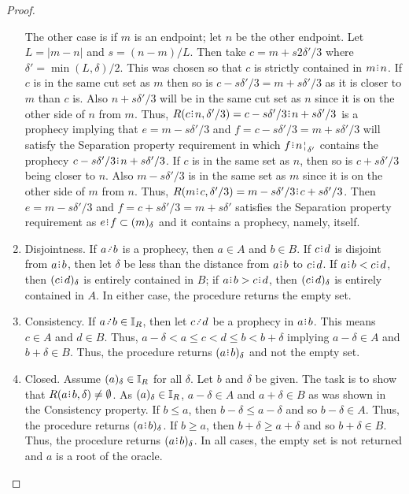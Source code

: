 \documentclass[12pt]{article}
\begin{document}
\begin{proof}
\begin{enumerate}
    The other case is if $m$ is an endpoint; let $n$ be the other endpoint. Let $L = |m-n|$ and $s = (n-m)/L$. Then take $c = m + s2\delta'/3$ where $\delta' = \min(L, \delta)/2$. This was chosen so that $c$ is strictly contained in $m\rint n$. If $c$ is in the same cut set as $m$ then so is $c -s \delta'/3 = m +s \delta'/3$ as it is closer to $m$ than $c$ is. Also $n + s \delta'/3$ will be in the same cut set as $n$ since it is on the other side of $n$ from $m$. Thus, $R(c\rint n, \delta'/3) = c-s\delta'/3 \rint  n+s \delta'/3$ is a prophecy implying that $e=m-s\delta'/3$ and $f=c-s\delta'/3 = m + s \delta'/3$ will satisfy the Separation property requirement in which $f\rint \fuzbright[\delta']{n}$ contains  the prophecy $c-s\delta'/3 \rint  n+s\delta'/3$. If $c$ is in the same set as $n$, then so is $c + s \delta'/3$ being closer to $n$. Also $m-s \delta'/3$ is in the same set as $m$ since it is on the other side of $m$ from $n$.  Thus, $R(m\rint c, \delta'/3) =  m-s\delta'/3\rint c+s\delta'/3$. Then $e = m-s \delta'/3$ and $f = c + s\delta'/3 = m + s\delta'$ satisfies the Separation property requirement as $e\rint f \subset \halo{m}$ and it contains a prophecy, namely, itself. 

    \item Disjointness. If $a\lte b$ is a prophecy, then $a \in A$ and $b \in B$. If $c\rint d$ is disjoint from $a\rint b$, then let $\delta$ be less than the distance from $a\rint b$ to $c\rint d$. If $a\rint b < c\rint d$, then $\halo{c\rint d}$ is entirely contained in $B$; if $a\rint b > c\rint d$, then $\halo{c\rint d}$ is entirely contained in $A$. In either case, the procedure returns the empty set. 
    
    \item Consistency. If $a \lte b \in \mathbb{I}_R$, then let $c\lte d$ be a prophecy in $a\rint b$. This means $c \in A$ and $d \in B$. Thus, $a-\delta < a \leq c < d \leq b < b + \delta$ implying $a-\delta \in A$ and $b+\delta \in B$. Thus, the procedure returns $\halo{a\rint b}$ and not the empty set. 
    
    \item Closed. Assume $(a)_{\delta} \in \mathbb{I}_R$ for all $\delta$. Let $b$ and $\delta$ be given. The task is to show that $R(a\rint b, \delta) \neq \emptyset$. As $(a)_{\delta} \in \mathbb{I}_R$, $a-\delta \in A$ and $a+\delta \in B$ as was shown in the Consistency property. If $b \leq a$, then $b-\delta \leq a- \delta$ and so $b-\delta \in A$. Thus, the procedure returns $\halo{a\rint b}$. If $b \geq a$, then $b+\delta \geq  a+\delta$ and so $b+\delta \in B$. Thus, the procedure returns $\halo{a\rint b}$. In all cases, the empty set is not returned and $a$ is a root of the oracle. 
\end{enumerate}


\end{proof}
\end{document}
